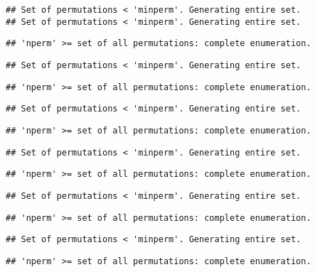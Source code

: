 \documentclass[]{article}
\begin{document}
\begin{verbatim}
## Set of permutations < 'minperm'. Generating entire set.
## Set of permutations < 'minperm'. Generating entire set.
\end{verbatim}

\begin{verbatim}
## 'nperm' >= set of all permutations: complete enumeration.
\end{verbatim}

\begin{verbatim}
## Set of permutations < 'minperm'. Generating entire set.
\end{verbatim}

\begin{verbatim}
## 'nperm' >= set of all permutations: complete enumeration.
\end{verbatim}

\begin{verbatim}
## Set of permutations < 'minperm'. Generating entire set.
\end{verbatim}

\begin{verbatim}
## 'nperm' >= set of all permutations: complete enumeration.
\end{verbatim}

\begin{verbatim}
## Set of permutations < 'minperm'. Generating entire set.
\end{verbatim}

\begin{verbatim}
## 'nperm' >= set of all permutations: complete enumeration.
\end{verbatim}

\begin{verbatim}
## Set of permutations < 'minperm'. Generating entire set.
\end{verbatim}

\begin{verbatim}
## 'nperm' >= set of all permutations: complete enumeration.
\end{verbatim}

\begin{verbatim}
## Set of permutations < 'minperm'. Generating entire set.
\end{verbatim}

\begin{verbatim}
## 'nperm' >= set of all permutations: complete enumeration.
\end{verbatim}
\end{document}
